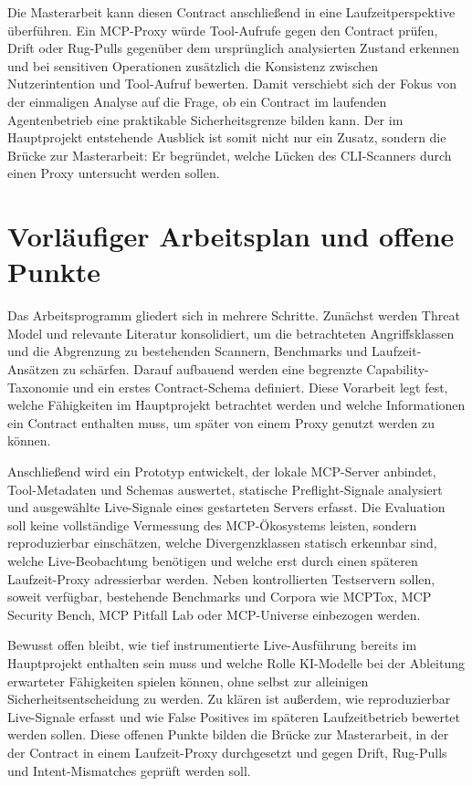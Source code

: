 \documentclass[pdflatex,sn-mathphys-num]{sn-jnl}%
\theoremstyle{thmstyleone}%
\theoremstyle{thmstyletwo}%
\theoremstyle{thmstylethree}%
\begin{document}
Die Masterarbeit kann diesen Contract anschlie{\ss}end in eine Laufzeitperspektive \"uberf\"uhren. Ein MCP-Proxy w\"urde Tool-Aufrufe gegen den Contract pr\"ufen, Drift oder Rug-Pulls gegen\"uber dem urspr\"unglich analysierten Zustand erkennen und bei sensitiven Operationen zus\"atzlich die Konsistenz zwischen Nutzerintention und Tool-Aufruf bewerten. Damit verschiebt sich der Fokus von der einmaligen Analyse auf die Frage, ob ein Contract im laufenden Agentenbetrieb eine praktikable Sicherheitsgrenze bilden kann. Der im Hauptprojekt entstehende Ausblick ist somit nicht nur ein Zusatz, sondern die Br\"ucke zur Masterarbeit: Er begr\"undet, welche L\"ucken des CLI-Scanners durch einen Proxy untersucht werden sollen.

\section{Vorl\"aufiger Arbeitsplan und offene Punkte}\label{sec:plan}

Das Arbeitsprogramm gliedert sich in mehrere Schritte. Zun\"achst werden Threat Model und relevante Literatur konsolidiert, um die betrachteten Angriffsklassen und die Abgrenzung zu bestehenden Scannern, Benchmarks und Laufzeit-Ans\"atzen zu sch\"arfen. Darauf aufbauend werden eine begrenzte Capability-Taxonomie und ein erstes Contract-Schema definiert. Diese Vorarbeit legt fest, welche F\"ahigkeiten im Hauptprojekt betrachtet werden und welche Informationen ein Contract enthalten muss, um sp\"ater von einem Proxy genutzt werden zu k\"onnen.

Anschlie{\ss}end wird ein Prototyp entwickelt, der lokale MCP-Server anbindet, Tool-Metadaten und Schemas auswertet, statische Preflight-Signale analysiert und ausgew\"ahlte Live-Signale eines gestarteten Servers erfasst. Die Evaluation soll keine vollst\"andige Vermessung des MCP-\"Okosystems leisten, sondern reproduzierbar einsch\"atzen, welche Divergenzklassen statisch erkennbar sind, welche Live-Beobachtung ben\"otigen und welche erst durch einen sp\"ateren Laufzeit-Proxy adressierbar werden. Neben kontrollierten Testservern sollen, soweit verf\"ugbar, bestehende Benchmarks und Corpora wie MCPTox, MCP Security Bench, MCP Pitfall Lab oder MCP-Universe einbezogen werden.

Bewusst offen bleibt, wie tief instrumentierte Live-Ausf\"uhrung bereits im Hauptprojekt enthalten sein muss und welche Rolle KI-Modelle bei der Ableitung erwarteter F\"ahigkeiten spielen k\"onnen, ohne selbst zur alleinigen Sicherheitsentscheidung zu werden. Zu kl\"aren ist au{\ss}erdem, wie reproduzierbar Live-Signale erfasst und wie False Positives im sp\"ateren Laufzeitbetrieb bewertet werden sollen. Diese offenen Punkte bilden die Br\"ucke zur Masterarbeit, in der der Contract in einem Laufzeit-Proxy durchgesetzt und gegen Drift, Rug-Pulls und Intent-Mismatches gepr\"uft werden soll.
\end{document}
